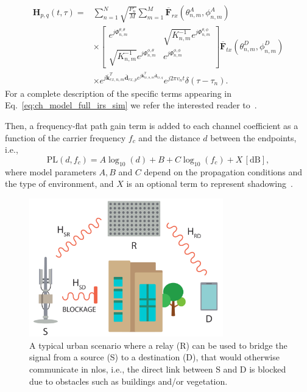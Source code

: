 \begin{equation}
\label{eq:ch_model_full_irs_sim}
\begin{aligned}
\bm{H}_{p, q}(t, \tau)=& \sum_{n=1}^{N} \sqrt{\frac{P_{n}}{M}} \sum_{m=1}^{M} \overline{\mathbf{F}}_{r x}\left(\theta_{n, m}^{A}, \phi_{n, m}^{A}\right) \\
& \times\left[\begin{array}{cr}
e^{j \Phi_{n, m}^{\theta, \theta}} & \sqrt{K_{n, m}^{-1}} e^{j \Phi_{n, m}^{\theta, \phi}} \\
\sqrt{K_{n, m}^{-1}} e^{j \Phi_{n, m}^{\phi, \theta}} & e^{j \Phi_{n, m}^{\phi, \phi}}
\end{array}\right] \overline{\mathbf{F}}_{tx}\left(\theta_{n, m}^{D}, \phi_{n, m}^{D}\right) \\
& \times e^{j \overline{\mathbf{k}}_{rx, n, m}^{T} \overline{\mathbf{d}}_{rx, p} e^{j \overline{\mathbf{k}}_{tx, n, m}^{T} \overline{\mathbf{d}}_{tx, q}}} e^{j 2 \pi v_{n} t} \delta\left(\tau-\tau_{n}\right).
\end{aligned}
\end{equation}
For a complete description of the specific terms appearing in Eq.~\eqref{eq:ch_model_full_irs_sim} we refer the interested reader to~\cite{zugno2020implementation}.

Then, a frequency-flat path gain term is added to each channel coefficient as a function of the carrier frequency $f_c$ and the distance $d$ between the endpoints, i.e.,  %
\begin{equation}
\text{PL} (d, f_c) = A \log_{10} (d) + B + C \log_{10} (f_c) + X \, [\mathrm{dB}],
\label{eq:pl}
\end{equation}
where model parameters $A, B$ and $C$ depend on the propagation conditions and the type of environment, and $X$ is an optional term to represent shadowing~\cite{zugno2020implementation}. 

\begin{figure}[t]
  \centering
    \includegraphics[width=0.75\textwidth]{Figures/IrsSimulation/Scenario_high_level.pdf}
  \caption{A typical urban scenario where a relay (R) can be used to bridge the signal from a source (S) to a destination (D), that would otherwise communicate in \acrshort{nlos}, i.e., the direct link between S and D is blocked due to obstacles such as buildings and/or vegetation.}
  \label{Fig:scenario_high_lvl}
\end{figure}


